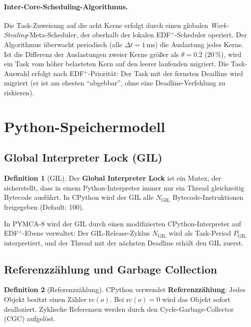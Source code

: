 ﻿\documentclass[a4paper,12pt]{scrreprt}
\theoremstyle{definition}
\newtheorem{definition}{Definition}[chapter]
\begin{document}
	\paragraph{Inter-Core-Scheduling-Algorithmus.}
	Die Task-Zuweisung auf die acht Kerne erfolgt durch einen globalen
	\emph{Work-Stealing}-Meta-Scheduler, der oberhalb der lokalen
	EDF$^+$-Scheduler operiert. Der Algorithmus überwacht periodisch
	(alle $\Delta t = 1\,\text{ms}$) die Auslastung jedes Kerns. Ist
	die Differenz der Auslastungen zweier Kerne größer als $\theta = 0.2$
	(20\,\%), wird ein Task vom höher belasteten Kern auf den leerer laufenden
	migriert. Die Task-Auswahl erfolgt nach EDF$^+$-Priorität: Der Task
	mit der fernsten Deadline wird migriert (er ist am ehesten ``abgebbar'',
	ohne eine Deadline-Verfehlung zu riskieren).
	
	\section{Python-Speichermodell}
	
	\subsection{Global Interpreter Lock (GIL)}
	
	\begin{definition}[GIL]
		Der \textbf{Global Interpreter Lock} ist ein Mutex, der sicherstellt,
		dass in einem Python-Interpreter immer nur ein Thread gleichzeitig
		Bytecode ausführt. In CPython wird der GIL alle $N_{\mathrm{GIL}}$
		Bytecode-Instruktionen freigegeben (Default: 100).
	\end{definition}
	
	In PYMCA-8 wird der GIL durch einen modifizierten CPython-Interpreter
	auf EDF$^+$-Ebene verwaltet: Der GIL-Release-Zyklus $N_{\mathrm{GIL}}$
	wird als Task-Period $P_{\mathrm{GIL}}$ interpretiert, und der Thread
	mit der nächsten Deadline erhält den GIL zuerst.
	
	\subsection{Referenzzählung und Garbage Collection}
	
	\begin{definition}[Referenzzählung]
		CPython verwendet \textbf{Referenzzählung}: Jedes Objekt besitzt
		einen Zähler $\mathrm{rc}(o)$. Bei $\mathrm{rc}(o) = 0$ wird das
		Objekt sofort dealloziert. Zyklische Referenzen werden durch den
		Cycle-Garbage-Collector (CGC) aufgelöst.
	\end{definition}
	
\end{document}
